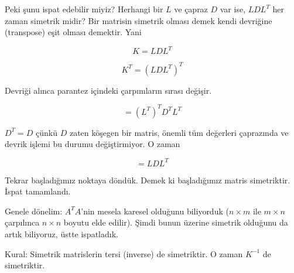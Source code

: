 \documentclass[12pt,fleqn]{article}\usepackage{../../common}
\begin{document}
Peki şunu ispat edebilir miyiz? Herhangi bir $L$ ve çapraz $D$ var ise,
$LDL^T$ her zaman simetrik midir? Bir matrisin simetrik olması demek
kendi devriğine (transpose) eşit olması demektir. Yani 

$$ K = LDL^T $$

$$ K^T = (LDL^T)^T $$

Devriği alınca parantez içindeki çarpımların sırası değişir.

$$ = (L^T)^TD^TL^T $$

$D^T = D$ çünkü $D$ zaten köşegen bir matris, önemli tüm değerleri
çaprazında ve devrik işlemi bu durumu değiştirmiyor. O zaman

$$ = LDL^T $$ 

Tekrar başladığımız noktaya döndük. Demek ki başladığımız matris
simetriktir. İspat tamamlandı. 

Genele dönelim: $A^TA$'nin mesela karesel olduğunu biliyorduk ($n \times m$ ile
$m \times n$ çarpılınca $n \times n$ boyutu elde edilir). Şimdi bunun üzerine
simetrik olduğunu da artık biliyoruz, üstte ispatladık.

Kural: Simetrik matrislerin tersi (inverse) de simetriktir. O zaman
$K^{-1}$ de simetriktir. 
\end{document}
